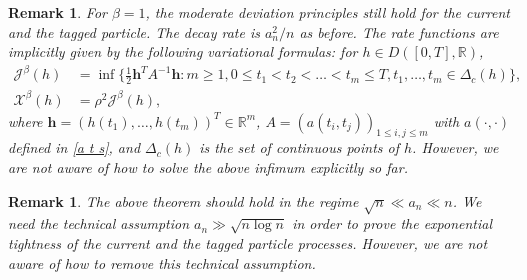 \documentclass[reqno,11pt]{amsart}
\numberwithin{equation}{section}
\newtheorem{remark}[theorem]{Remark}
\newcommand{\R}{\mathbb{R}}
\begin{document}
\begin{remark}\label{rmk: beta equals 1}
For $\beta = 1$,  the moderate deviation principles still hold for the current and the tagged particle.  The decay rate is $a_n^2/n$ as before. The rate functions are implicitly given by the following variational formulas: for $h \in D([0,T],\R)$,
\begin{align*}
	\mathcal{J}^\beta (h) &=\inf \Big\{\frac{1}{2} \mathbf{h}^T A^{-1} \mathbf{h}:  m \geq 1, 0 \leq t_1 < t_2 < \ldots < t_m \leq T, t_1,\ldots,t_m \in \Delta_c (h)\Big\},\\
	\mathcal{X}^\beta (h) &= \rho^2 \mathcal{J}^\beta (h),
\end{align*}
where $\mathbf{h} = (h(t_1), \ldots, h(t_m))^T \in \R^m$, $A = (a(t_i,t_j))_{1 \leq i,j \leq m}$ with $a(\cdot,\cdot)$ defined in \eqref{a t s}, and $\Delta_c (h)$ is the set of continuous points of $h$.  However, we are not aware of how to solve the above infimum explicitly so far.
\end{remark}

\begin{remark}
The above theorem should hold in the regime $\sqrt{n} \ll a_n \ll n$.  We need the technical assumption $a_n \gg \sqrt{n \log n}$ in order to prove the exponential tightness of the current and the tagged particle processes. However, we are not aware of how to remove this technical assumption.
\end{remark}
\end{document}
